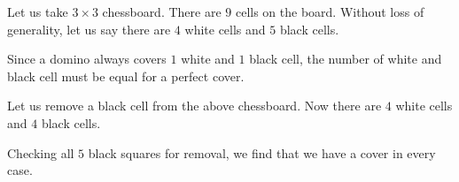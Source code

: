 \begin{scratch}[b]
  Let us take $3 \times 3$ chessboard. There are $9$ cells on the board. Without loss of generality, let us say there are $4$ white cells and $5$ black cells.

  Since a domino always covers $1$ white and $1$ black cell, the number of white and black cell must be equal for a perfect cover.

  Let us remove a black cell from the above chessboard. Now there are $4$ white cells and $4$ black cells.

  Checking all $5$ black squares for removal, we find that we have a cover in every case.
\end{scratch}

\begin{solution}[b]
\end{solution}